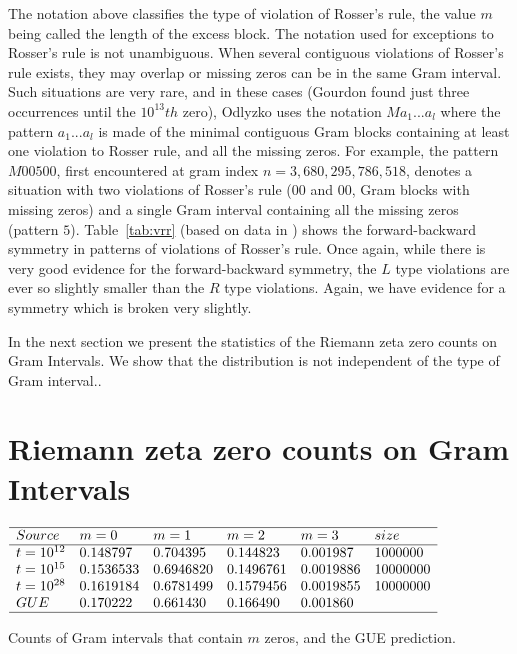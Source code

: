 \documentclass[twoside]{article}
\begin{document}
The notation above classifies the type of violation of Rosser's rule, the value $m$ being called the length of the excess block. The notation used for exceptions to Rosser's rule is not unambiguous. When several contiguous violations of Rosser's rule exists, they may overlap or missing zeros can be in the same Gram interval. Such situations are very rare, and in these cases (Gourdon found just three occurrences until the $10^{13}th$ zero), Odlyzko uses the notation $Ma_1 ...a_l$ where the pattern $a_1 . . . a_l$ is made of the minimal contiguous Gram blocks containing at least one violation to Rosser rule, and all the missing zeros. For example, the pattern $M00500$, first encountered at gram index $n = 3,680,295,786,518$, denotes a situation with two violations of Rosser's rule ($00$ and $00$, Gram blocks with missing zeros) and a single Gram interval containing all the missing zeros (pattern $5$). 
Table~\ref{tab:vrr}  (based on data in \cite{gourdon}) shows the forward-backward symmetry in patterns of violations of Rosser's rule. Once again, while there is very good evidence for the forward-backward symmetry, the $L$ type violations are ever so slightly smaller than the $R$ type violations. Again, we have evidence for a symmetry which is broken very slightly.

In the next section we present the statistics of the Riemann zeta zero counts on Gram Intervals. We show that the distribution is not independent of the type of Gram interval..

\section{\label{sec5}Riemann zeta zero counts on Gram Intervals}

\begin{table}
\centering \(\begin{array}{llllll}
\hline
Source &m = 0&m = 1&m = 2&m = 3&size\\
\hline
t = 10^{12}&0.148797&0.704395&0.144823&0.001987&1000000\\
t = 10^{15}&0.1536533&0.6946820&0.1496761&0.0019886&10000000\\
t = 10^{28}&0.1619184&0.6781499&0.1579456&0.0019855&10000000\\
 GUE&0.170222&0.661430&0.166490&0.001860&\\
\hline
\end{array}\)
\caption{Counts of Gram intervals that contain $m$ zeros, and the GUE prediction.} \label{tab:intervalzeros}
\end{table}
\end{document}
